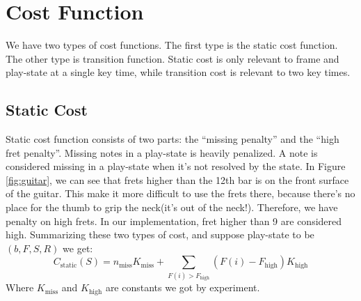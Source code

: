 \section{Cost Function} \label{section:cost-function}
We have two types of cost functions. The first type is the static cost function. The other type is transition function. Static cost is only relevant to frame and play-state at a single key time, while transition cost is relevant to two key times. 

\subsection{Static Cost}
Static cost function consists of two parts: the ``missing penalty'' and the ``high fret penalty''. Missing notes in a play-state is heavily penalized. A note is considered missing in a play-state when it's not resolved by the state. In Figure \ref{fig:guitar}, we can see that frets higher than the 12th bar is on the front surface of the guitar. This make it more difficult to use the frets there, because there's no place for the thumb to grip the neck(it's out of the neck!). Therefore, we have penalty on high frets. In our implementation, fret higher than 9 are considered high. Summarizing these two types of cost, and suppose play-state to be $(b, F, S, R)$  we get:
    \[
    C_{\mathrm{static}}(S) = n_{\mathrm{miss}} K_{\mathrm{miss}} 
        + \sum_{F(i) > F_{\mathrm{high}}} (F(i) - F_{\mathrm{high}}) K_{\mathrm{high}}
    \]
Where $K_{\mathrm{miss}}$ and $K_{\mathrm{high}}$ are constants we got by experiment. 

